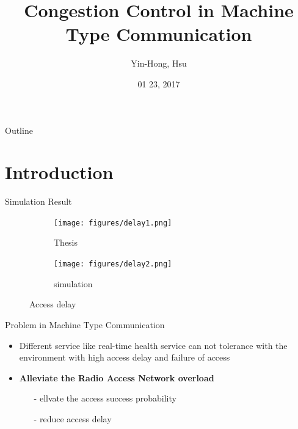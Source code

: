 \documentclass{beamer}
\title {
    Congestion Control in Machine Type Communication 
}
\author {
    Yin-Hong, Hsu
}
\date {
    01 23, 2017
}
\begin{document}
\begin{frame}
    \titlepage
\end{frame}


\begin{frame}{Outline}
    \tableofcontentsgather
    \tableofcontents
\end{frame}


\section{Introduction}

\begin{frame} {Simulation Result} 
    \begin{figure}
        \centering
        \begin{subfigure}{.5\textwidth}
          \centering
          \texttt{[image: figures/delay1.png]}
          \caption{Thesis}
          \label{fig:sub1}
        \end{subfigure}%
        \begin{subfigure}{.5\textwidth}
          \centering
          \texttt{[image: figures/delay2.png]}
          \caption{simulation}
          \label{fig:sub2}
        \end{subfigure}
        \caption{Access delay}
        \label{fig:test}
    \end{figure}
\end{frame}

\begin{frame} {Problem in Machine Type Communication} 
    \begin{itemize}
        \item {Different service like real-time health service can not tolerance with the environment with high access delay and failure of access}
        \item \textbf{Alleviate the Radio Access Network overload}
        \begin{itemize}    
            \item[-]{ellvate the access success probability}
        \end{itemize}
        \begin{itemize}    
            \item[-]{reduce access delay}
        \end{itemize}
    \end{itemize}
\end{frame}
\end{document}

